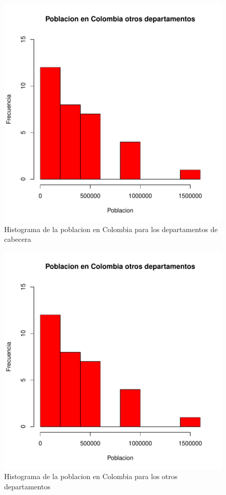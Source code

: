 \begin{figure}[h]
\centering
\includegraphics{univariada-summaryDatos}
\caption{Histograma de la poblacion en Colombia para los departamentos de cabecera}
\label{barplot2}
\end{figure}
\begin{figure}[h]
\centering
\includegraphics{univariada-summaryDatos}
\caption{Histograma de la poblacion en Colombia para los otros departamentos}
\label{barplot3}
\end{figure}
